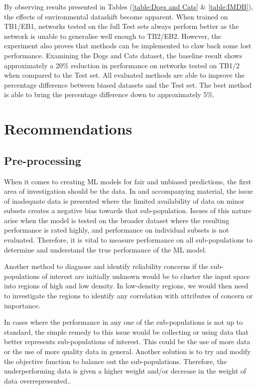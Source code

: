 By observing results presented in Tables (\ref{table:Dogs and Cats} \& \ref{table:IMDB}), the effects of environmental datashift become apparent.
When trained on TB1/EB1, networks tested on the full Test sets always perform better as the network is unable to generalise well enough to TB2/EB2.
However, the experiment also proves that methods can be implemented to claw back some lost performance. 
Examining the Dogs and Cats dataset, the baseline result shows approximately a 20\% reduction in performance on networks tested on TB1/2 when compared to the Test set.
All evaluated methods are able to improve the percentage difference between biased datasets and the Test set. 
The best method is able to bring the percentage difference down to approximately 5\%.

\pagebreak
\section{Recommendations}
\subsection{Pre-processing} 
When it comes to creating ML models for fair and unbiased predictions, the first area of investigation should be the data.
In \cite{saria2019tutorial} and accompanying material, the issue of inadequate data is presented where the limited availability of data on minor subsets creates a negative bias towards that sub-population.
Issues of this nature arise when the model is tested on the broader dataset where the resulting performance is rated highly, and performance on individual subsets is not evaluated.
Therefore, it is vital to measure performance on all sub-populations to determine and understand the true performance of the ML model.

Another method to diagnose and identify reliability concerns if the sub-populations of interest are initially unknown 
would be to cluster the input space into regions of high and low density.
In low-density regions, we would then need to investigate the regions to identify any correlation with attributes of concern or importance.

In cases where the performance in any one of the sub-populations is not up to standard, the simple remedy to this issue would be collecting or using data that better represents sub-populations of interest.
This could be the use of more data or the use of more quality data in general.
Another solution is to try and modify the objective function to balance out the sub-populations. 
Therefore, the underperforming data is given a higher weight and/or decrease in the weight of data overrepresented.. 

